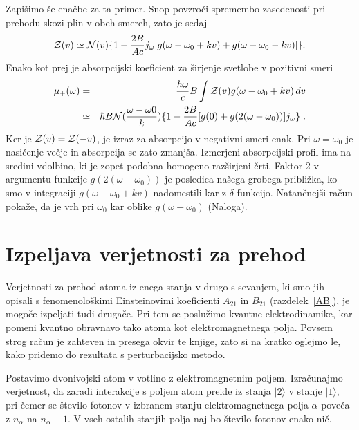 Zapišimo še enačbe za ta primer. Snop povzroči spremembo zasedenosti
pri prehodu skozi plin v obeh smereh, zato je sedaj 
\begin{equation}
{\cal Z}(v)\simeq{\cal N}(v)\{1-\frac{2B}{Ac}j_{\omega}[g(\omega-\omega_{0}+kv)+g(\omega-\omega_{0}-kv)]\}.\label{4.92}
\end{equation}
 Enako kot prej je absorpcijski koeficient za širjenje svetlobe v
pozitivni smeri 
\begin{eqnarray}
\mu_{+}(\omega) & = & \frac{\hbar\omega}{c}B\int{\cal Z}(v)g(\omega-\omega_{0}+kv)\, dv\nonumber \\
 & \simeq & \hbar B{\cal N}(\frac{\omega-\omega0}{k})\{1-\frac{2B}{Ac}[g(0)+g(2(\omega-\omega_{0}))]j_{\omega}\}\;.
\end{eqnarray}
 Ker je ${\cal Z}(v)={\cal Z}(-v)$, je izraz za absorpcijo v negativni
smeri enak. Pri $\omega=\omega_{0}$ je nasičenje večje in absorpcija
se zato zmanjša. Izmerjeni absorpcijski profil ima na sredini vdolbino,
ki je zopet podobna homogeno razširjeni črti. Faktor 2 v argumentu
funkcije $g(2(\omega-\omega_{0}))$ je posledica našega grobega približka,
ko smo v integraciji $g(\omega-\omega_{0}+kv)$ nadomestili kar z
$\delta$ funkcijo. Natančnejši račun pokaže, da je vrh pri $\omega_{0}$
kar oblike $g(\omega-\omega_{0})$ (Naloga).

\section{Izpeljava verjetnosti za prehod}
\label{chap:verjetnost}
Verjetnosti za prehod atoma iz enega stanja v drugo s sevanjem, ki
smo jih opisali s fenomenološkimi Einsteinovimi koeficienti $A_{21}$
in $B_{21}$ (razdelek~\ref{AB}), je mogoče izpeljati tudi drugače.
Pri tem se poslužimo kvantne elektrodinamike, kar pomeni kvantno obravnavo 
tako atoma kot elektromagnetnega polja. Povsem strog račun je zahteven in presega
okvir te knjige, zato si na kratko oglejmo le, kako pridemo do rezultata s
perturbacijsko metodo.

Postavimo dvonivojski atom v votlino z elektromagnetnim poljem.
Izračunajmo verjetnost, da zaradi interakcije s poljem atom
preide iz stanja $|2\rangle$ v stanje $|1\rangle$, pri čemer se
število fotonov v izbranem stanju elektromagnetnega polja $\alpha$
poveča z $n_{\alpha}$ na $n_{\alpha}+1$. V vseh ostalih stanjih
polja naj bo število fotonov enako nič.

